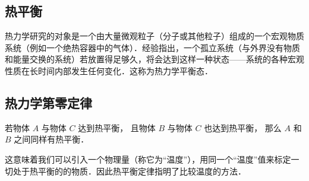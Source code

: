
\begin{issues}
\issueDraft
\end{issues}

\subsection{热平衡}
热力学研究的对象是一个由大量微观粒子（分子或其他粒子）组成的一个宏观物质系统（例如一个绝热容器中的气体）．经验指出，一个孤立系统（与外界没有物质和能量交换的系统）若放置得足够久，将会达到这样一种状态——系统的各种宏观性质在长时间内部发生任何变化．这称为热力学平衡态．

\subsection{热力学第零定律}
若物体 $A$ 与物体 $C$ 达到热平衡， 且物体 $B$ 与物体 $C$ 也达到热平衡， 那么 $A$ 和 $B$ 之间同样有热平衡．

这意味着我们可以引入一个物理量（称它为“温度”），用同一个“温度”值来标定一切处于热平衡的的物质．因此热平衡定律指明了比较温度的方法．

